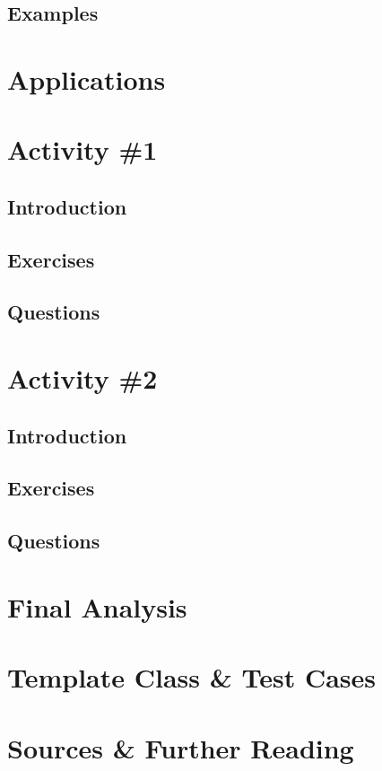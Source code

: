 		\subsection{Examples}

	\section{Applications}
	
	\section{Activity \#1}
		\subsection{Introduction}
		\subsection{Exercises}
		\subsection{Questions}

	\section{Activity \#2}
		\subsection{Introduction}
		\subsection{Exercises}
		\subsection{Questions}

	\section{Final Analysis}

	\section{Template Class \& Test Cases}

	\section{Sources \& Further Reading}


